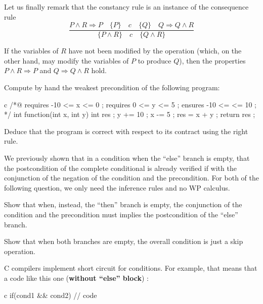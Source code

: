 Let us finally remark that the constancy rule is an instance of the
consequence rule
$$\dfrac{P \wedge R \Rightarrow P \quad \{P\}\quad c\quad \{Q\} \quad Q \Rightarrow Q \wedge R}{\{P \wedge R\}\quad c\quad \{Q \wedge R\}}$$


If the variables of $R$ have not been modified by the operation
(which, on the other hand, may modify the variables of $P$ to produce
$Q$), then the properties $P \wedge R \Rightarrow P$ and
$Q \Rightarrow Q \wedge R$ hold.








Compute by hand the weakest precondition of the following program:


\begin{CodeBlock}{c}
/*@
  requires -10 <= x <= 0 ;
  requires 0 <= y <= 5 ;
  ensures -10 <= \result <= 10 ;
*/
int function(int x, int y){
  int res ;
  y += 10 ;
  x -= 5 ;
  res = x + y ;
  return res ;
}
\end{CodeBlock}


Deduce that the program is correct with respect to its contract using the
right rule.




We previously shown that in a condition when the ``else'' branch is empty,
that the postcondition of the complete conditional is already verified if
with the conjunction of the negation of the condition and the precondition.
For both of the following question, we only need the inference rules and
no WP calculus.

Show that when, instead, the ``then'' branch is empty, the conjunction of
the condition and the precondition must implies the postcondition of the
``else'' branch.

Show that when both branches are empty, the overall condition is just a
skip operation.




C compilers implement short circuit for conditions. For example, that
means that a code like this one (\textbf{without ``else'' block}) :


\begin{CodeBlock}{c}
if(cond1 && cond2){
  // code
}
\end{CodeBlock}



